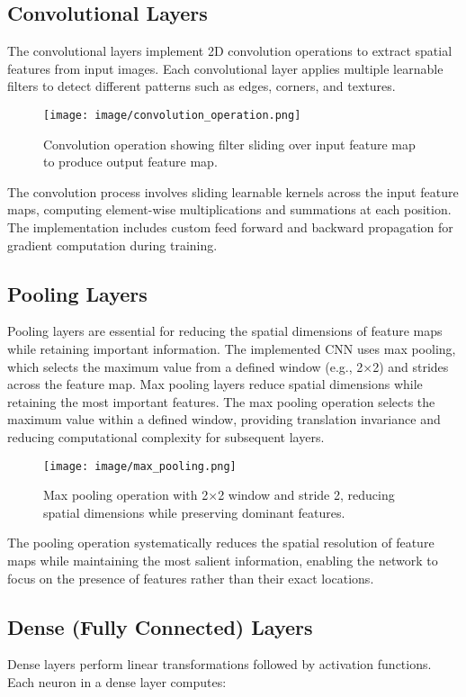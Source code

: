 \documentclass[conference]{IEEEtran}
\begin{document}
\subsection{Convolutional Layers}
The convolutional layers implement 2D convolution operations to extract spatial features from input images. Each convolutional layer applies multiple learnable filters to detect different patterns such as edges, corners, and textures.

\begin{figure}[htbp]
\centerline{\texttt{[image: image/convolution\_operation.png]}}
\caption{Convolution operation showing filter sliding over input feature map to produce output feature map.}
\label{fig:convolution}
\end{figure}

The convolution process involves sliding learnable kernels across the input feature maps, computing element-wise multiplications and summations at each position. The implementation includes custom feed forward and backward propagation for gradient computation during training.

\subsection{Pooling Layers}
Pooling layers are essential for reducing the spatial dimensions of feature maps while retaining important information. The implemented CNN uses max pooling, which selects the maximum value from a defined window (e.g., 2×2) and strides across the feature map.
Max pooling layers reduce spatial dimensions while retaining the most important features. The max pooling operation selects the maximum value within a defined window, providing translation invariance and reducing computational complexity for subsequent layers.

\begin{figure}[htbp]
\centerline{\texttt{[image: image/max\_pooling.png]}}
\caption{Max pooling operation with 2×2 window and stride 2, reducing spatial dimensions while preserving dominant features.}
\label{fig:pooling}
\end{figure}

The pooling operation systematically reduces the spatial resolution of feature maps while maintaining the most salient information, enabling the network to focus on the presence of features rather than their exact locations.

\subsection{Dense (Fully Connected) Layers}
Dense layers perform linear transformations followed by activation functions. Each neuron in a dense layer computes:
\end{document}
